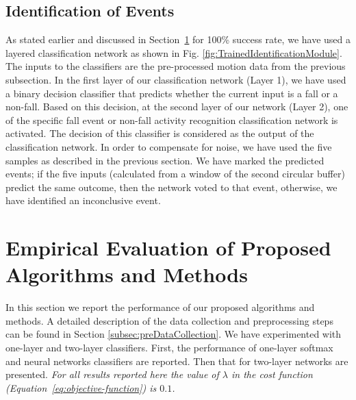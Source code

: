 \documentclass[]{IEEEtran}
\begin{document}
\subsection{Identification of Events}

As stated earlier and discussed in Section~\ref{Evaluation} for 100\% success
rate, we have used a layered classification network as shown in Fig.
\ref{fig:TrainedIdentificationModule}. The inputs to the classifiers are the
pre-processed motion data from the previous subsection. In the first layer of
our classification network (Layer 1), we have used a binary decision classifier
that predicts whether the current input is a fall or a non-fall. Based on this
decision, at the second layer of our network (Layer 2), one of the specific
fall event or non-fall activity recognition classification network is
activated. The decision of this classifier is considered as the output of the
classification network. In order to compensate for noise, we have used the five
samples as described in the previous section. We have marked the predicted
events; if the five inputs (calculated from a window of the second circular
buffer) predict the same outcome, then the network voted to that event,
otherwise, we have identified an inconclusive event. 



\section{Empirical Evaluation of Proposed Algorithms and Methods}
\label{Evaluation}

In this section we report the performance of our proposed algorithms and
methods. A detailed description of the data collection and preprocessing steps
can be found in Section \ref{subsec:preDataCollection}.  We have experimented
with one-layer and two-layer classifiers.  First, the performance of one-layer
softmax and neural networks classifiers are reported. Then that for two-layer
networks are presented.  \emph{For all results reported here the value of
$\lambda$ in the cost function (Equation~\ref{eq:objective-function}) is
$0.1$.}
\end{document}
